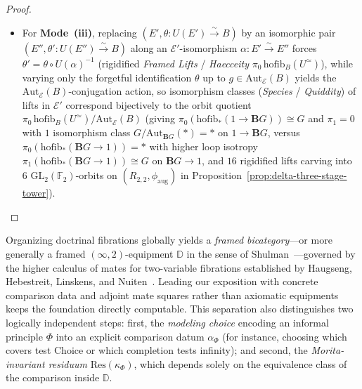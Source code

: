 \begin{proof}
\begin{itemize}
  \item For \textbf{Mode~(iii)}, replacing $(E', \theta : U(E') \xrightarrow{\sim} B)$ by an isomorphic pair $(E'', \theta' : U(E'') \xrightarrow{\sim} B)$ along an $\mathcal{E}'$-isomorphism $\alpha : E' \xrightarrow{\sim} E''$ forces $\theta' = \theta \circ U(\alpha)^{-1}$ (rigidified \emph{Framed Lifts} / \emph{Haecceity} $\pi_0\,\mathrm{hofib}_B(U^{\simeq})$), while varying only the forgetful identification $\theta$ up to $g \in \mathrm{Aut}_{\mathcal{E}}(B)$ yields the $\mathrm{Aut}_{\mathcal{E}}(B)$-conjugation action, so isomorphism classes (\emph{Species} / \emph{Quiddity}) of lifts in $\mathcal{E}'$ correspond bijectively to the orbit quotient $\pi_0\,\mathrm{hofib}_B(U^{\simeq}) / \mathrm{Aut}_{\mathcal{E}}(B)$ (giving $\pi_0(\mathrm{hofib}_*(1 \to \mathbf{B}G)) \cong G$ and $\pi_1 = 0$ with $1$ isomorphism class $G/\mathrm{Aut}_{\mathbf{B}G}(*) = *$ on $1 \to \mathbf{B}G$, versus $\pi_0(\mathrm{hofib}_*(\mathbf{B}G \to 1)) = *$ with higher loop isotropy $\pi_1(\mathrm{hofib}_*(\mathbf{B}G \to 1)) \cong G$ on $\mathbf{B}G \to 1$, and $16$ rigidified lifts carving into $6$ $\mathrm{GL}_2(\mathbb{F}_2)$-orbits on $(R_{2,2}, \phi_{\mathrm{aug}})$ in Proposition~\ref{prop:delta-three-stage-tower}).\qedhere
\end{itemize}
\end{proof}

\begin{remark}\label{rem:framed-equipments}%
%
Organizing doctrinal fibrations globally yields a \emph{framed bicategory}---or more generally a framed $(\infty, 2)$-equipment $\mathbb{D}$ in the sense of Shulman~\cite{Shulman08}---governed by the higher calculus of mates for two-variable fibrations established by Haugseng, Hebestreit, Linskens, and Nuiten~\cite{HHLN23}. Leading our exposition with concrete comparison data and adjoint mate squares rather than axiomatic equipments keeps the foundation directly computable. This separation also distinguishes two logically independent steps: first, the \emph{modeling choice} encoding an informal principle $\Phi$ into an explicit comparison datum $\alpha_\Phi$ (for instance, choosing which covers test Choice or which completion tests infinity); and second, the \emph{Morita-invariant residuum} $\mathrm{Res}(\kappa_\Phi)$, which depends solely on the equivalence class of the comparison inside $\mathbb{D}$.
\end{remark}

